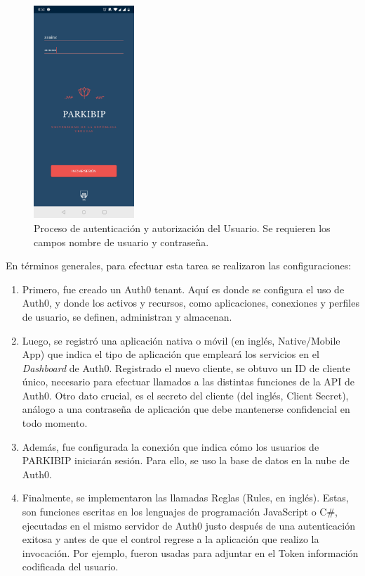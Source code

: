 \begin{figure}[H]
 \centering
 \includegraphics[height=8cm]{TESIS/imagenes/chap05/activity-login.JPG}
 \caption{Proceso de autenticación y autorización del Usuario. Se requieren los campos nombre de usuario y contraseña.}
 \label{fig:activity-login}
\end{figure}

En términos generales, para efectuar esta tarea se realizaron las configuraciones:

\begin{enumerate}
    \item Primero, fue creado un Auth0 tenant. Aquí es donde se configura el uso de Auth0, y donde los activos y recursos, como aplicaciones, conexiones y perfiles de usuario, se definen, administran y almacenan.
    \item Luego, se registró una aplicación nativa o móvil (en inglés, Native/Mobile App) que indica el tipo de aplicación que empleará los servicios en el \textit{Dashboard} de Auth0. Registrado el nuevo cliente, se obtuvo un ID de cliente único, necesario para efectuar llamados a las distintas funciones de la API de Auth0. Otro dato crucial, es el secreto del cliente (del inglés, Client Secret), análogo a una contraseña de aplicación que debe mantenerse confidencial en todo momento.
    \item Además, fue configurada la conexión que indica cómo los usuarios de PARKIBIP iniciarán sesión. Para ello, se uso la base de datos en la nube de Auth0.
    \item Finalmente, se implementaron las llamadas Reglas (Rules, en inglés). Estas, son funciones escritas en los lenguajes de programación JavaScript o C\#, ejecutadas en el mismo servidor de Auth0 justo después de una autenticación exitosa y antes de que el control regrese a la aplicación que realizo la invocación. Por ejemplo, fueron usadas para adjuntar en el Token información codificada del usuario.
\end{enumerate}

